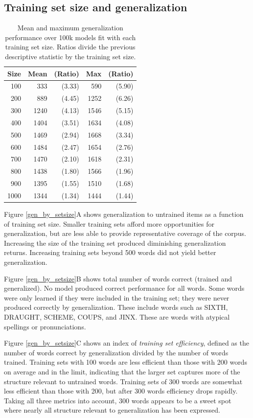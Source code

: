 \documentclass[10pt,letterpaper]{article}
\newcommand{\exword}[1]{\MakeUppercase{#1}}
\begin{document}
\subsection{Training set size and generalization}
\begin{table}[b]
	\begin{center}
		\begin{tabular}{r r r r r}
			Size & Mean & (Ratio) & Max & (Ratio) \\
			\toprule
			100&333&(3.33)&590&(5.90)\\
			200&889&(4.45)&1252&(6.26)\\
			300&1240&(4.13)&1546&(5.15)\\
			400&1404&(3.51)&1634&(4.08)\\
			500&1469&(2.94)&1668&(3.34)\\
			600&1484&(2.47)&1654&(2.76)\\
			700&1470&(2.10)&1618&(2.31)\\
			800&1438&(1.80)&1566&(1.96)\\
			900&1395&(1.55)&1510&(1.68)\\
			1000&1344&(1.34)&1444&(1.44)\\
		\end{tabular}
		\caption{Mean and maximum generalization performance over 100k models fit with each training set size. Ratios divide the previous descriptive statistic by the training set size.}
	\end{center}
\end{table}

Figure \ref{gen_by_setsize}A shows generalization to untrained items as a function of training set size.  Smaller training sets afford more opportunities for generalization, but are less able to provide representative coverage of the corpus. Increasing the size of the training set produced diminishing generalization returns. Increasing training sets beyond 500 words did not yield better generalization. 

Figure \ref{gen_by_setsize}B shows total number of words correct (trained and generalized). No model produced correct performance for all words. Some words were only learned if they were included in the training set; they were never produced correctly by generalization. These include words such as \exword{sixth}, \exword{draught}, \exword{scheme}, \exword{coups}, and \exword{jinx}. These are words with atypical spellings or pronunciations. 

Figure \ref{gen_by_setsize}C shows an index of \emph{training set efficiency}, defined as the number of words correct by generalization divided by the number of words trained. Training sets with 100 words are less efficient than those with 200 words on average and in the limit, indicating that the larger set captures more of the structure relevant to untrained words. Training sets of 300 words are somewhat less efficient than those with 200, but after 300 words efficiency drops rapidly. Taking all three metrics into account, 300 words appears to be a sweet spot where nearly all structure relevant to generalization has been expressed. 
\end{document}
